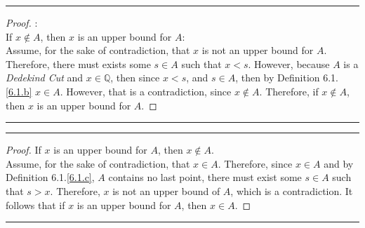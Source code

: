 \documentclass[openany, amssymb, psamsfonts]{amsart}
\newcommand{\bbQ}{\mathbb{Q}}
\theoremstyle{definition}
\numberwithin{equation}{section}
\begin{document}
\vspace{4pt}     \hrule   \vspace{4pt} \begin{proof} :\\
If $x\notin A$, then $x$ is an upper bound for $A$:\\
Assume, for the sake of contradiction, that $x$ is not an upper bound for $A$. Therefore, there must exists some $s\in A$ such that $x<s$. However, because $A$ is a \textit{Dedekind Cut} and $x\in \bbQ$, then since $x<s$, and $s\in A$, then by Definition 6.1.\ref{6.1.b} $x\in A$. However, that is a contradiction, since $x\notin A$. Therefore, if $x\notin A$, then $x$ is an upper bound for $A$.
\end{proof} \vspace{4pt}     \hrule   \vspace{4pt}
\vspace{4pt}     \hrule   \vspace{4pt} \begin{proof} 
If $x$ is an upper bound for $A$, then $x\notin A$.\\
Assume, for the sake of contradiction, that $x\in A$. Therefore, since $x\in A$ and by Definition 6.1.\ref{6.1.c}, $A$ contains no last point, there must exist some $s\in A$ such that $s>x$. Therefore, $x$ is not an upper bound of $A$, which is a contradiction. It follows that if $x$ is an upper bound for $A$, then $x\in A$.
\end{proof} \vspace{4pt}     \hrule   \vspace{4pt}
\end{document}
